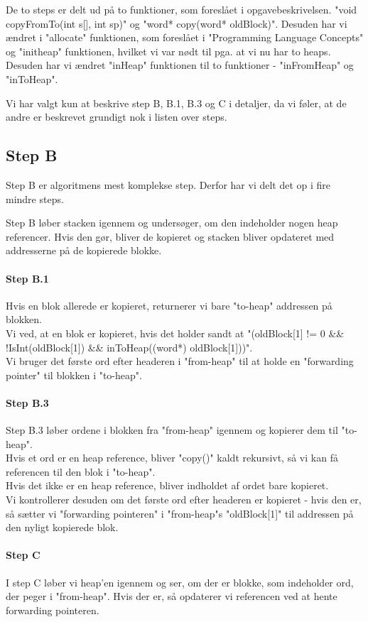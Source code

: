 De to steps er delt ud på to funktioner, som foreslået i opgavebeskrivelsen. "void copyFromTo(int s[], int sp)" og "word* copy(word* oldBlock)". Desuden har vi ændret i "allocate" funktionen, som foreslået i "Programming Language Concepts" og "initheap" funktionen, hvilket vi var nødt til pga. at vi nu har to heaps. Desuden har vi ændret "inHeap" funktionen til to funktioner - "inFromHeap" og "inToHeap".

Vi har valgt kun at beskrive step B, B.1, B.3 og C i detaljer, da vi føler, at de andre er beskrevet grundigt nok i listen over steps.
\subsection{Step B}
Step B er algoritmens mest komplekse step. Derfor har vi delt det op i fire mindre steps.

Step B løber stacken igennem og undersøger, om den indeholder nogen heap referencer. Hvis den gør, bliver de kopieret og stacken bliver opdateret med addresserne på de kopierede blokke.
\paragraph{Step B.1}
Hvis en blok allerede er kopieret, returnerer vi bare "to-heap" addressen på blokken. 
\\Vi ved, at en blok er kopieret, hvis det holder sandt at "(oldBlock[1] != 0 \&\& !IsInt(oldBlock[1]) \&\& inToHeap((word*) oldBlock[1]))". 
\\Vi bruger det første ord efter headeren i "from-heap" til at holde en "forwarding pointer" til blokken i "to-heap".
\paragraph{Step B.3}
Step B.3 løber ordene i blokken fra "from-heap" igennem og kopierer dem til "to-heap". 
\\Hvis et ord er en heap reference, bliver "copy()" kaldt rekursivt, så vi kan få referencen til den blok i "to-heap".
\\Hvis det ikke er en heap reference, bliver indholdet af ordet bare kopieret.
\\ Vi kontrollerer desuden om det første ord efter headeren er kopieret - hvis den er, så sætter vi "forwarding pointeren" i "from-heap"s "oldBlock[1]" til addressen på den nyligt kopierede blok.
\paragraph{Step C}
I step C løber vi heap'en igennem og ser, om der er blokke, som indeholder ord, der peger i "from-heap". Hvis der er, så opdaterer vi referencen ved at hente forwarding pointeren.
